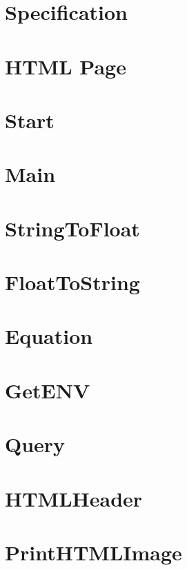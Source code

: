\documentclass{article}
\begin{document}
\section*{Specification}


\newpage\section*{HTML Page}


\newpage\section*{Start}


\newpage\section*{Main}


\newpage\section*{StringToFloat}


\newpage\section*{FloatToString}


\newpage\section*{Equation}


\newpage\section*{GetENV}


\newpage\section*{Query}


\newpage\section*{HTMLHeader}


\newpage\section*{PrintHTMLImage}

\end{document}
